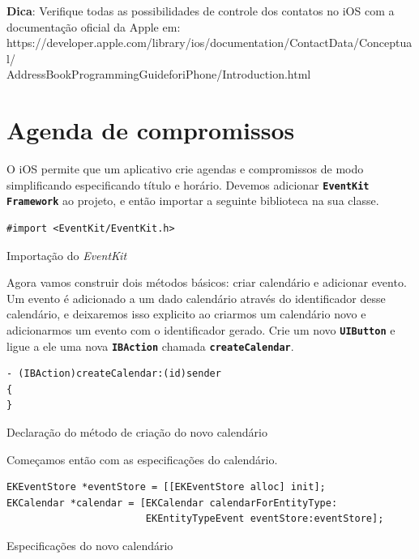 \documentclass[a4paper,12pt,brazil,doubleside]{book}
\begin{document}
\begin{singlespace}
\begin{framed}

\textbf{Dica}: Verifique todas as possibilidades de controle dos contatos no iOS com a documentação oficial da Apple em:\\ https://developer.apple.com/library/ios/documentation/ContactData/Conceptual/\\AddressBookProgrammingGuideforiPhone/Introduction.html
\end{framed}

\section{Agenda de compromissos}


O iOS permite que um aplicativo crie agendas e compromissos de modo simplificando especificando título e horário. Devemos adicionar \texttt{\textbf{EventKit Framework}} ao projeto, e então importar a seguinte biblioteca na sua classe.

\begin{listing}[H]
\begin{verbatim}
#import <EventKit/EventKit.h>
\end{verbatim}
\caption{Importação do \emph{EventKit}}
\end{listing}

Agora vamos construir dois métodos básicos: criar calendário e adicionar evento. Um evento é adicionado a um dado calendário através do identificador desse calendário, e deixaremos isso explicito ao criarmos um calendário novo e adicionarmos um evento com o identificador gerado. Crie um novo \texttt{\textbf{UIButton}} e ligue a ele uma nova \texttt{\textbf{IBAction}} chamada \texttt{\textbf{createCalendar}}.

\begin{listing}[H]
\begin{verbatim}
- (IBAction)createCalendar:(id)sender
{
}
\end{verbatim}
\caption{Declaração do método de criação do novo calendário}
\end{listing}


Começamos então com as especificações do calendário.

\begin{listing}[H]
\begin{verbatim}
EKEventStore *eventStore = [[EKEventStore alloc] init];
EKCalendar *calendar = [EKCalendar calendarForEntityType:
						EKEntityTypeEvent eventStore:eventStore];
\end{verbatim}
\caption{Especificações do novo calendário}
\end{listing}



\end{singlespace}
\end{document}

